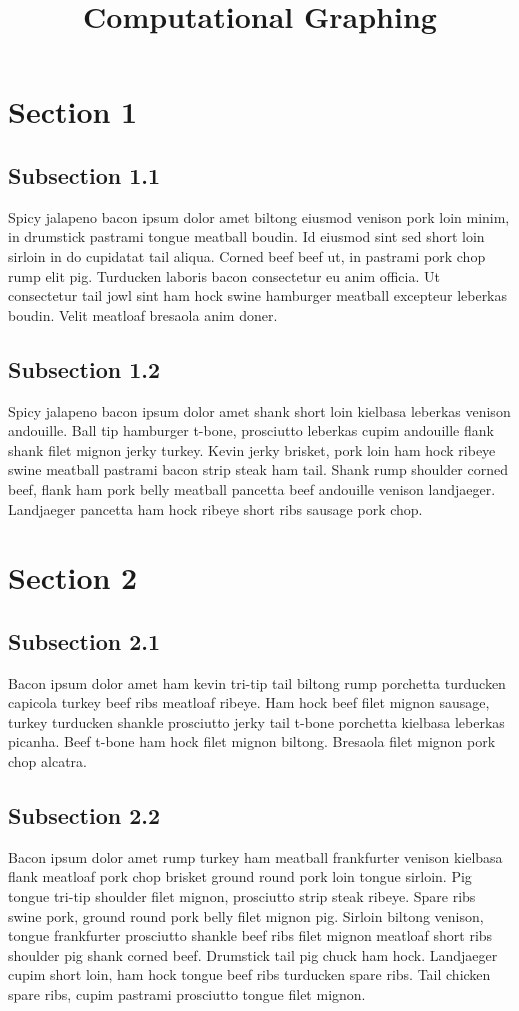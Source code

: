 \documentclass[12pt]{memoir}
\title{Computational Graphing}
\begin{document}
    \newcommand{\documentname}{User Manual}
    
    \newpage

	\tableofcontents

	\newpage
	
	\section{Section 1}
	\subsection{Subsection 1.1}
	Spicy jalapeno bacon ipsum dolor amet biltong eiusmod venison pork loin minim, in drumstick pastrami tongue meatball boudin. Id eiusmod sint sed short loin sirloin in do cupidatat tail aliqua. Corned beef beef ut, in pastrami pork chop rump elit pig. Turducken laboris bacon consectetur eu anim officia. Ut consectetur tail jowl sint ham hock swine hamburger meatball excepteur leberkas boudin. Velit meatloaf bresaola anim doner.
	
	\subsection{Subsection 1.2}
	Spicy jalapeno bacon ipsum dolor amet shank short loin kielbasa leberkas venison andouille. Ball tip hamburger t-bone, prosciutto leberkas cupim andouille flank shank filet mignon jerky turkey. Kevin jerky brisket, pork loin ham hock ribeye swine meatball pastrami bacon strip steak ham tail. Shank rump shoulder corned beef, flank ham pork belly meatball pancetta beef andouille venison landjaeger. Landjaeger pancetta ham hock ribeye short ribs sausage pork chop.
	
	\newpage
	\section{Section 2}
	\subsection{Subsection 2.1}
	Bacon ipsum dolor amet ham kevin tri-tip tail biltong rump porchetta turducken capicola turkey beef ribs meatloaf ribeye. Ham hock beef filet mignon sausage, turkey turducken shankle prosciutto jerky tail t-bone porchetta kielbasa leberkas picanha. Beef t-bone ham hock filet mignon biltong. Bresaola filet mignon pork chop alcatra.
	
	\subsection{Subsection 2.2}
	Bacon ipsum dolor amet rump turkey ham meatball frankfurter venison kielbasa flank meatloaf pork chop brisket ground round pork loin tongue sirloin. Pig tongue tri-tip shoulder filet mignon, prosciutto strip steak ribeye. Spare ribs swine pork, ground round pork belly filet mignon pig. Sirloin biltong venison, tongue frankfurter prosciutto shankle beef ribs filet mignon meatloaf short ribs shoulder pig shank corned beef. Drumstick tail pig chuck ham hock. Landjaeger cupim short loin, ham hock tongue beef ribs turducken spare ribs. Tail chicken spare ribs, cupim pastrami prosciutto tongue filet mignon.
	
\end{document}
